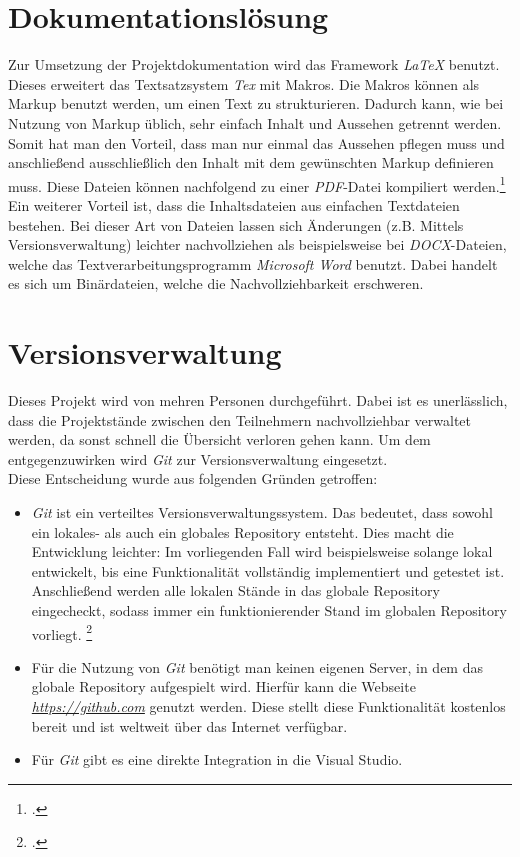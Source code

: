 \section{Dokumentationslösung}
\label{sec:dokumentationslösung}
Zur Umsetzung der Projektdokumentation wird das Framework \textit{LaTeX} benutzt. Dieses erweitert das Textsatzsystem \textit{Tex} mit \glspl{Makro}. Die \glspl{Makro} können als \gls{Markup} benutzt werden, um einen Text zu strukturieren. Dadurch kann, wie bei Nutzung von \gls{Markup} üblich, sehr einfach Inhalt und Aussehen getrennt werden. Somit hat man den Vorteil, dass man nur einmal das Aussehen pflegen muss und anschließend ausschließlich den Inhalt mit dem gewünschten \gls{Markup} definieren muss. Diese Dateien können nachfolgend zu einer \textit{PDF}-Datei kompiliert werden.\footcite{online:definition-latex}\\ 
Ein weiterer Vorteil ist, dass die Inhaltsdateien aus einfachen Textdateien bestehen. Bei dieser Art von Dateien lassen sich Änderungen (z.B. Mittels Versionsverwaltung) leichter nachvollziehen als beispielsweise bei \textit{DOCX}-Dateien, welche das Textverarbeitungsprogramm \textit{Microsoft Word} benutzt. Dabei handelt es sich um Binärdateien, welche die Nachvollziehbarkeit erschweren.
\section{Versionsverwaltung}
\label{sec:versionsverwaltung}
Dieses Projekt wird von mehren Personen durchgeführt. Dabei ist es unerlässlich, dass die Projektstände zwischen den Teilnehmern nachvollziehbar verwaltet werden, da sonst schnell die Übersicht verloren gehen kann. Um dem entgegenzuwirken wird \textit{Git} zur Versionsverwaltung eingesetzt. \\
Diese Entscheidung wurde aus folgenden Gründen getroffen:
\begin{itemize}
\item \textit{Git} ist ein verteiltes Versionsverwaltungssystem. Das bedeutet, dass sowohl ein lokales- als auch ein globales Repository entsteht. Dies macht die Entwicklung leichter: Im vorliegenden Fall wird beispielsweise solange lokal entwickelt, bis eine Funktionalität vollständig implementiert und getestet ist. Anschließend werden alle lokalen Stände in das globale Repository eingecheckt, sodass immer ein funktionierender Stand im globalen Repository vorliegt. \footcite{online:definition-git}
\item Für die Nutzung von \textit{Git} benötigt man keinen eigenen Server, in dem das globale Repository aufgespielt wird. Hierfür kann die Webseite \href{https://github.com}{\textit{https://github.com}} genutzt werden. Diese stellt diese Funktionalität kostenlos bereit und ist weltweit über das Internet verfügbar. 
\item Für \textit{Git} gibt es eine direkte Integration in die \ac{Visual Studio}.
\end{itemize}